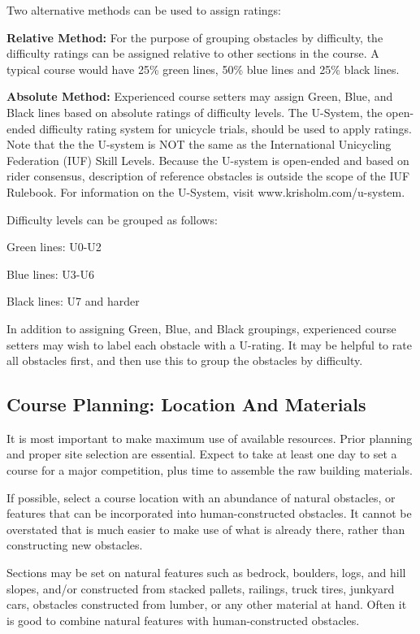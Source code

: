 Two alternative methods can be used to assign ratings:

\textbf{Relative Method:}
For the purpose of grouping obstacles by difficulty, the difficulty ratings can be assigned relative to other sections in the course.
A typical course would have 25\% green lines, 50\% blue lines and 25\% black lines.

\textbf{Absolute Method:}
Experienced course setters may assign Green, Blue, and Black lines based on absolute ratings of difficulty levels.
The U-System, the open-ended difficulty rating system for unicycle trials, should be used to apply ratings.
Note that the the U-system is NOT the same as the International Unicycling Federation (IUF) Skill Levels.
Because the U-system is open-ended and based on rider consensus, description of reference obstacles is outside the scope of the IUF Rulebook.
For information on the U-System, visit www.krisholm.com/u-system.

Difficulty levels can be grouped as follows:

Green lines: U0-U2

Blue lines: U3-U6

Black lines: U7 and harder

In addition to assigning Green, Blue, and Black groupings, experienced course setters may wish to label each obstacle with a U-rating.
It may be helpful to rate all obstacles first, and then use this to group the obstacles by difficulty.

\subsection{Course Planning: Location And Materials}
It is most important to make maximum use of available resources.
Prior planning and proper site selection are essential.
Expect to take at least one day to set a course for a major competition, plus time to assemble the raw building materials.

If possible, select a course location with an abundance of natural obstacles, or features that can be incorporated into human-constructed obstacles.
It cannot be overstated that is much easier to make use of what is already there, rather than constructing new obstacles.

Sections may be set on natural features such as bedrock, boulders, logs, and hill slopes, and/or constructed from stacked pallets, railings, truck tires, junkyard cars, obstacles constructed from lumber, or any other material at hand.
Often it is good to combine natural features with human-constructed obstacles.

